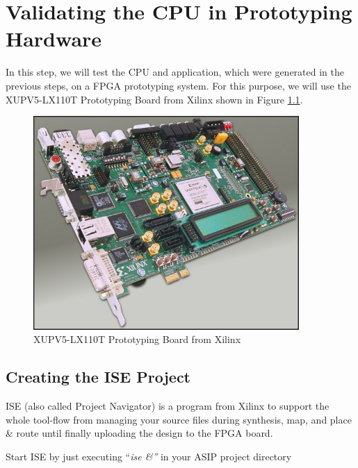 \hypertarget{validating-the-cpu-in-prototyping-hardware}{%
\chapter{Validating the CPU in Prototyping
Hardware}\label{validating-the-cpu-in-prototyping-hardware}}

In this step, we will test the CPU and application, which were generated
in the previous steps, on a FPGA prototyping system. For this purpose,
we will use the XUPV5-LX110T Prototyping Board from Xilinx shown in Figure \ref{fig:fig61}.
\begin{figure}[!htb]
	\centering
	\includegraphics[width=0.9\textwidth]{src/images/6-1.png}
	\caption{XUPV5-LX110T Prototyping Board from Xilinx \cite{HWAFX}}
	\label{fig:fig61}
\end{figure}
\hypertarget{creating-the-ise-project}{%
\section{Creating the ISE Project}\label{creating-the-ise-project}}

ISE (also called Project Navigator) is a program from Xilinx to support
the whole tool-flow from managing your source files during synthesis,
map, and place \& route until finally uploading the design to the FPGA
board.

Start ISE by just executing ``\emph{ise \&''} in your ASIP project
directory


